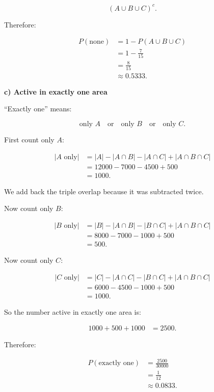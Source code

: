 \documentclass[10pt]{article}
\begin{document}
\[
(A\cup B\cup C)^c.
\]

Therefore:

\begin{align*}
P(\text{none})
&=
1-P(A\cup B\cup C) \\[1mm]
&=
1-\frac{7}{15} \\[1mm]
&=
\frac{8}{15} \\[1mm]
&\approx 0.5333.
\end{align*}

\textbf{c) Active in exactly one area}

``Exactly one'' means:

\[
\text{only }A
\quad\text{or}\quad
\text{only }B
\quad\text{or}\quad
\text{only }C.
\]

First count only \(A\):

\begin{align*}
|A\text{ only}|
&=
|A|-|A\cap B|-|A\cap C|
+|A\cap B\cap C| \\
&=
12000-7000-4500+500 \\
&=1000.
\end{align*}

We add back the triple overlap because it was subtracted twice.

Now count only \(B\):

\begin{align*}
|B\text{ only}|
&=
|B|-|A\cap B|-|B\cap C|
+|A\cap B\cap C| \\
&=
8000-7000-1000+500 \\
&=500.
\end{align*}

Now count only \(C\):

\begin{align*}
|C\text{ only}|
&=
|C|-|A\cap C|-|B\cap C|
+|A\cap B\cap C| \\
&=
6000-4500-1000+500 \\
&=1000.
\end{align*}

So the number active in exactly one area is:

\begin{align*}
1000+500+1000
&=
2500.
\end{align*}

Therefore:

\begin{align*}
P(\text{exactly one})
&=
\frac{2500}{30000} \\[1mm]
&=
\frac{1}{12} \\[1mm]
&\approx 0.0833.
\end{align*}
\end{document}
